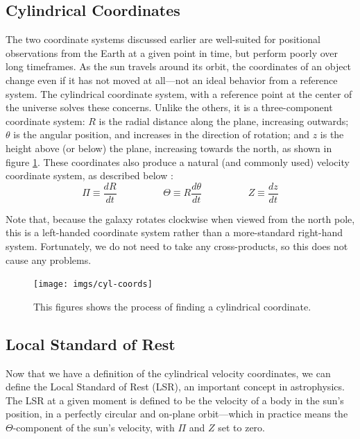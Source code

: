 \documentclass[12pt,twoside]{reedthesis}
\begin{document}
\subsection*{Cylindrical Coordinates}

The two coordinate systems discussed earlier are well-suited for positional observations from the Earth at a given point in time, but perform poorly over long timeframes. As the sun travels around its orbit, the coordinates of an object change even if it has not moved at all---not an ideal behavior from a reference system. The cylindrical coordinate system, with a reference point at the center of the universe solves these concerns. Unlike the others, it is a three-component coordinate system: $R$ is the radial distance along the plane, increasing outwards; $\theta$ is the angular position, and increases in the direction of rotation; and $z$ is the height above (or below) the plane, increasing towards the north, as shown in figure \ref{cylindrical-coords}. These coordinates also produce a natural (and commonly used) velocity coordinate system, as described below \citep{modern-astrophysics}:
\begin{equation}
    \Pi \equiv \frac{dR}{dt} \hspace{2cm} \Theta \equiv R\frac{d\theta}{dt} \hspace{2cm} Z \equiv \frac{dz}{dt}
\end{equation}

Note that, because the galaxy rotates clockwise when viewed from the north pole, this is a left-handed coordinate system rather than a more-standard right-hand system. Fortunately, we do not need to take any cross-products, so this does not cause any problems.

\begin{figure}[p]
    \texttt{[image: imgs/cyl-coords]}
    \caption{This figures shows the process of finding a cylindrical coordinate.}
    \label{cylindrical-coords}
\end{figure}

\subsection*{Local Standard of Rest}

Now that we have a definition of the cylindrical velocity coordinates, we can define the Local Standard of Rest (LSR), an important concept in astrophysics. The LSR at a given moment is defined to be the velocity of a body in the sun's position, in a perfectly circular and on-plane orbit---which in practice means the $\Theta$-component of the sun's velocity, with $\Pi$ and $Z$ set to zero.
\end{document}
